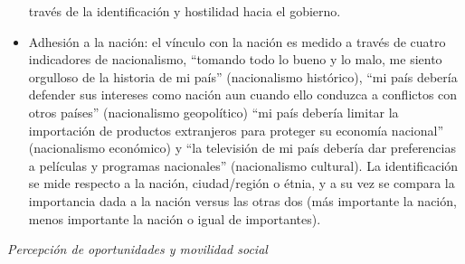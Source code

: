 \documentclass[
  12pt,
]{book}
\begin{document}
\begin{itemize}
  través de la identificación y hostilidad hacia el gobierno.
\item
  Adhesión a la nación: el vínculo con la nación es medido a través de
  cuatro indicadores de nacionalismo, ``tomando todo lo bueno y lo
  malo, me siento orgulloso de la historia de mi país'' (nacionalismo
  histórico), ``mi país debería defender sus intereses como nación aun
  cuando ello conduzca a conflictos con otros países'' (nacionalismo
  geopolítico) ``mi país debería limitar la importación de productos
  extranjeros para proteger su economía nacional'' (nacionalismo
  económico) y ``la televisión de mi país debería dar preferencias a
  películas y programas nacionales'' (nacionalismo cultural). La
  identificación se mide respecto a la nación, ciudad/región o étnia,
  y a su vez se compara la importancia dada a la nación versus las
  otras dos (más importante la nación, menos importante la nación o
  igual de importantes).
\end{itemize}

\emph{Percepción de oportunidades y movilidad social}
\end{document}
